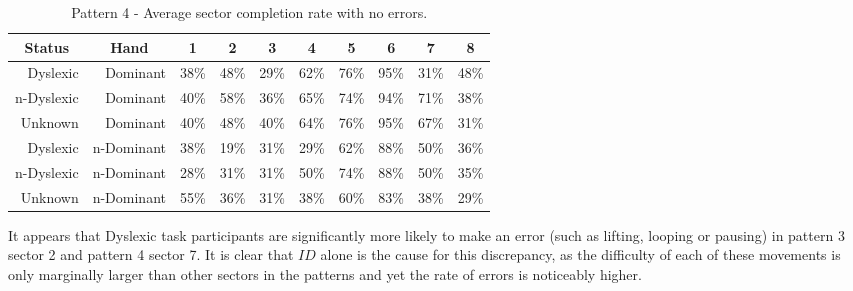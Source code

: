 		\begin{table}[h]
			\centering
			\caption{Pattern 4 - Average sector completion rate with no errors.}
			\label{tab_pat_4_com}
			\begin{tabularx}{\textwidth}{|r|r|X|X|X|X|X|X|X|X|}
			\hline
			\multicolumn{1}{|c|}{\textbf{Status}} & \multicolumn{1}{c|}{\textbf{Hand}} & \multicolumn{1}{c|}{\textbf{1}} & \multicolumn{1}{c|}{\textbf{2}} & \multicolumn{1}{c|}{\textbf{3}} & \multicolumn{1}{c|}{\textbf{4}} & \multicolumn{1}{c|}{\textbf{5}} & \multicolumn{1}{c|}{\textbf{6}} & \multicolumn{1}{c|}{\textbf{7}} & \multicolumn{1}{c|}{\textbf{8}}\\ \hline
				Dyslexic                              & Dominant                           & 38\%       & 48\%       & 29\%       & 62\%       & 76\%       & 95\%       & 31\%       & 48\%       \\ \hline
				n-Dyslexic                          & Dominant                           & 40\%       & 58\%       & 36\%       & 65\%       & 74\%       & 94\%       & 71\%       & 38\%       \\ \hline
				Unknown                    & Dominant                           & 40\%       & 48\%       & 40\%       & 64\%       & 76\%       & 95\%       & 67\%       & 31\%       \\ \hline
				Dyslexic                              & n-Dominant                       & 38\%       & 19\%       & 31\%       & 29\%       & 62\%       & 88\%       & 50\%       & 36\%       \\ \hline
				n-Dyslexic                          & n-Dominant                       & 28\%       & 31\%       & 31\%       & 50\%       & 74\%       & 88\%       & 50\%       & 35\%       \\ \hline
				Unknown                    & n-Dominant                       & 55\%       & 36\%       & 31\%       & 38\%       & 60\%       & 83\%       & 38\%       & 29\%       \\ \hline
			\end{tabularx}
		\end{table}
		
		It appears that Dyslexic task participants are significantly more likely to make an error (such as lifting, looping or pausing) in pattern 3 sector 2 and pattern 4 sector 7. It is clear that \(ID\) alone is the cause for this discrepancy, as the difficulty of each of these movements is only marginally larger than other sectors in the patterns and yet the rate of errors is noticeably higher.
		
